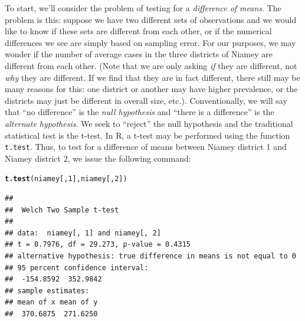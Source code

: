 \documentclass{article}\usepackage[]{graphicx}\usepackage[]{color}
\makeatletter
\newcommand{\hlnum}[1]{\textcolor[rgb]{0.686,0.059,0.569}{#1}}%
\newcommand{\hlstd}[1]{\textcolor[rgb]{0.345,0.345,0.345}{#1}}%
\newcommand{\hlkwd}[1]{\textcolor[rgb]{0.737,0.353,0.396}{\textbf{#1}}}%
\newenvironment{kframe}{%
 \def\at@end@of@kframe{}%
 \ifinner\ifhmode%
  \def\at@end@of@kframe{\end{minipage}}%
  \begin{minipage}{\columnwidth}%
 \fi\fi%
 \def\FrameCommand##1{\hskip\@totalleftmargin \hskip-\fboxsep
 \colorbox{shadecolor}{##1}\hskip-\fboxsep
     \hskip-\linewidth \hskip-\@totalleftmargin \hskip\columnwidth}%
 \MakeFramed {\advance\hsize-\width
   \@totalleftmargin\z@ \linewidth\hsize
   \@setminipage}}%
 {\par\unskip\endMakeFramed%
 \at@end@of@kframe}
\newenvironment{knitrout}{}{} %
\newcommand{\R}{\textsf{R}}
\newcommand{\code}[1]{\texttt{#1}}
\theoremstyle{exercise}
\makeatother
\begin{document}
To start, we'll consider the problem of testing for a \textit{difference of means}. The problem is this: suppose we have two different sets of observations and we would like to know if these sets are different from each other, or if the numerical differences we see are simply based on sampling error. For our purposes, we may wonder if the number of average cases in the three districts of Niamey are different from each other. (Note that we are only asking \textit{if} they are different, not \textit{why} they are different. If we find that they are in fact different, there still may be many reasons for this: one district or another may have higher prevalence, or the districts may just be different in overall size, etc.). Conventionally, we will say that ``no difference'' is the \textit{null hypothesis} and ``there is a difference'' is the \textit{alternate hypothesis}. We seek to ``reject'' the null hypothesis and the traditional statistical test is the t-test. In \R, a t-test may be performed using the function \code{t.test}. Thus, to test for a difference of means between Niamey district 1 and Niamey district 2, we issue the following command:

\begin{knitrout}
\color{fgcolor}\begin{kframe}
\begin{alltt}
\hlkwd{t.test}\hlstd{(niamey[,}\hlnum{1}\hlstd{], niamey[,}\hlnum{2}\hlstd{])}
\end{alltt}
\begin{verbatim}
## 
## 	Welch Two Sample t-test
## 
## data:  niamey[, 1] and niamey[, 2]
## t = 0.7976, df = 29.273, p-value = 0.4315
## alternative hypothesis: true difference in means is not equal to 0
## 95 percent confidence interval:
##  -154.8592  352.9842
## sample estimates:
## mean of x mean of y 
##  370.6875  271.6250
\end{verbatim}
\end{kframe}
\end{knitrout}
\end{document}
